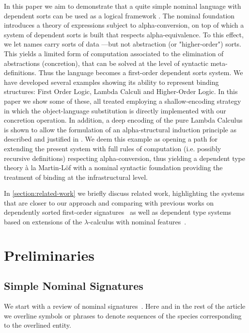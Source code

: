 \documentclass[copyright,creativecommons]{eptcs}
\newcounter{s}
\begin{document}
In this paper we aim to demonstrate that a quite simple nominal language with dependent sorts can be used as a logical framework \cite{harper:fradl}.
The nominal foundation introduces a theory of expressions subject to alpha-conversion,
on top of which a system of dependent sorts is built that respects  alpha-equivalence. To this effect, we let names carry sorts of data ---but not abstraction (or "higher-order") sorts. This yields a limited form of computation associated to the elimination of abstractions (concretion), that can be solved at the level of syntactic meta-definitions.
Thus the language becomes a first-order dependent sorts system.
We have developed several examples showing its ability to represent binding structures: First Order Logic, Lambda Calculi and Higher-Order Logic. In this paper we show some of these, all treated employing a shallow-encoding strategy in which the object-language substitution is directly implemented with our concretion operation. 
In addition, a deep encoding of the pure Lambda Calculus is shown to allow the  formulation of an alpha-structural induction principle as described and justified in \cite{pitts:alpsri}. We deem this example as opening a path for extending the present system with full rules of computation (i.e. possibly recursive definitions) respecting alpha-conversion, thus yielding a dependent type theory \`a la Martin-L\"of with a nominal syntactic foundation providing the treatment of binding at the infrastructural level.

In \cref{section:related-work} we briefly discuss  related work, highlighting the systems that are closer to our approach and comparing with previous works on dependently sorted first-order signatures~\cite{Cartmell86,SterlingJ:algttu} as well as dependent type systems based on extensions of the $\lambda$-calculus with nominal features~\cite{CheneyJ:depntt,PittsA:deptta}.

\section{Preliminaries}

\subsection{Simple Nominal Signatures}

We start with a review of  nominal signatures~\cite{UrbanC:nomu-jv,pitts:alpsri}. 
Here and in the rest of the article we overline symbols or phrases to denote sequences of the species corresponding to the overlined entity.
\end{document}
